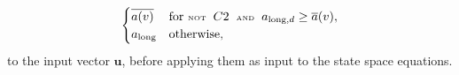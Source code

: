 \begin{equation}
\begin{split}
\begin{cases}
    \overline{a(v)} & \text{for } \text{\tiny NOT}\hspace{0.2cm} C2 \hspace{0.2cm}\text{\tiny AND}\hspace{0.2cm} a_{\text{long},d} \geq \overline{a}(v), \\
    a_{\text{long}} & \text{otherwise},
    \end{cases}
\end{split}
\label{eq:vehicle_control_actions}
\end{equation}
to the input vector $\mathbf{u}$, before applying them as input to the state space equations.



